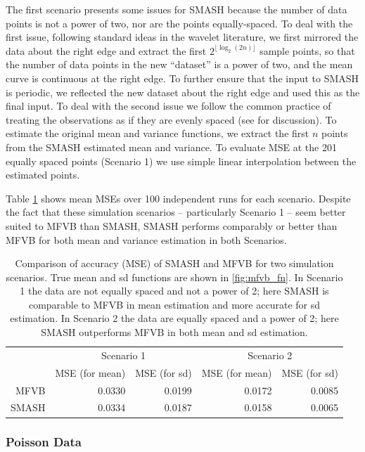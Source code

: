 \documentclass[12pt]{article}
\begin{document}
The first scenario presents some issues for SMASH because the number of data points is not a power of two, nor are the points equally-spaced. To deal with the first issue, following standard ideas in the wavelet literature, we first mirrored the data about the right edge and extract the first $2^{\lfloor\log_2(2n)\rfloor}$ sample points, so that the number of data points in the new ``dataset'' is a power of two, and the mean curve is continuous at the right edge. To further ensure that the input to SMASH is periodic, we reflected the new dataset about the right edge and used this as the final input. 
To deal with the second issue we follow the common practice of treating the observations as if they are evenly spaced (see \cite{Sardy1999Wavelet} for discussion). To estimate the original mean and variance functions, we extract the first $n$ points from the SMASH estimated mean and variance. 
To evaluate MSE at the 201 equally spaced points (Scenario 1) we use simple linear interpolation between the estimated points. 

Table \ref{table:mfvb_comp} shows mean MSEs over 100 independent runs for each scenario.
Despite the fact that these simulation scenarios -- particularly Scenario 1 -- seem better suited to MFVB than SMASH, 
SMASH performs comparably or better than MFVB for both mean and variance estimation in both Scenarios. 
\begin{table}[ht]
\centering
\begin{tabular}{rrrrr}
\hline
& \multicolumn{2}{c}{Scenario 1}&\multicolumn{2}{c}{Scenario 2}\\
\cline{2-5}
& MSE (for mean) & MSE (for sd) & MSE (for mean) & MSE (for sd) \\
\hline
MFVB & 0.0330 & 0.0199 & 0.0172 & 0.0085 \\
SMASH & 0.0334 & 0.0187 & 0.0158 & 0.0065 \\
\hline
\end{tabular}
\caption{Comparison of accuracy (MSE) of SMASH and MFVB for two simulation scenarios.  True mean and sd functions are shown in \ref{fig:mfvb_fn}. 
In Scenario 1 the data are not equally spaced and not a power of 2; here SMASH is comparable to MFVB in mean estimation and more accurate for sd estimation.
In Scenario 2 the data are equally spaced and a power of 2; here SMASH outperforms MFVB in both mean and sd estimation.}
\label{table:mfvb_comp}
\end{table}

 

\subsubsection{Poisson Data}
\end{document}
